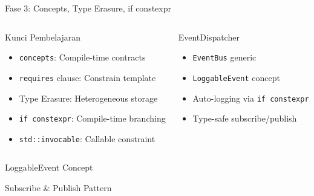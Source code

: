 \documentclass[aspectratio=169,10pt]{beamer}
\newcommand{\concepts}{\texttt{concepts}}
\begin{document}
\begin{frame}{Fase 3: Concepts, Type Erasure, if constexpr}
  \begin{columns}[T]
    \begin{block}{Kunci Pembelajaran}
      \begin{itemize}
        \item \concepts: Compile-time contracts
        \item \texttt{requires} clause: Constrain template
        \item Type Erasure: Heterogeneous storage
        \item \texttt{if constexpr}: Compile-time branching
        \item \texttt{std::invocable}: Callable constraint
      \end{itemize}
    \end{block}
    \begin{exampleblock}{EventDispatcher}
      \begin{itemize}
        \item \texttt{EventBus} generic
        \item \texttt{LoggableEvent} concept
        \item Auto-logging via \texttt{if constexpr}
        \item Type-safe subscribe/publish
      \end{itemize}
    \end{exampleblock}
  \end{columns}
\end{frame}

\begin{frame}[fragile]{LoggableEvent Concept}
  
\end{frame}

\begin{frame}[fragile]{Subscribe \& Publish Pattern}
  
\end{frame}
\end{document}

